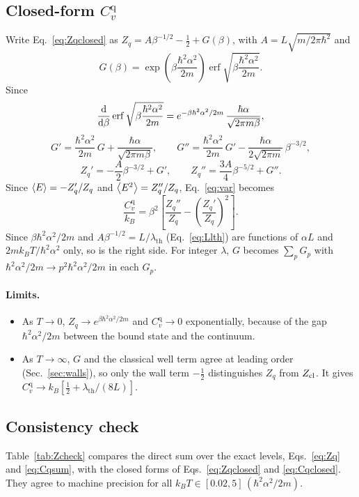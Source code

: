 \documentclass[11pt]{article}
\numberwithin{equation}{section}
\providecommand{\erf}{\operatorname{erf}}
\newcommand{\lth}{\lambda_{\mathrm{th}}}
\newcommand{\Cq}{C_v^{\mathrm{q}}}
\newcommand{\kB}{k_{B}}
\begin{document}
\subsection{Closed-form \texorpdfstring{$\Cq$}{Cq}}
Write Eq.~\eqref{eq:Zqclosed} as $Z_q=A\beta^{-1/2}-\tfrac12+G(\beta)$, with $A=L\sqrt{m/2\pi\hbar^2}$ and
\[
G(\beta)=\exp\!\left(\beta\frac{\hbar^2\alpha^2}{2m}\right)\erf\sqrt{\beta\frac{\hbar^2\alpha^2}{2m}} .
\]
Since
\[
\dv{\beta}\erf\sqrt{\beta\frac{\hbar^2\alpha^2}{2m}}=e^{-\beta\hbar^2\alpha^2/2m}\,\frac{\hbar\alpha}{\sqrt{2\pi m\beta}},
\]
\begin{equation}
G'=\frac{\hbar^2\alpha^2}{2m}\,G+\frac{\hbar\alpha}{\sqrt{2\pi m\beta}},\qquad
G''=\frac{\hbar^2\alpha^2}{2m}\,G'-\frac{\hbar\alpha}{2\sqrt{2\pi m}}\,\beta^{-3/2},
\end{equation}
\begin{equation}
Z_q'=-\frac A2\beta^{-3/2}+G',\qquad Z_q''=\frac{3A}{4}\beta^{-5/2}+G''.
\end{equation}
Since $\expval{E}=-Z_q'/Z_q$ and $\expval{E^2}=Z_q''/Z_q$, Eq.~\eqref{eq:var} becomes
\begin{equation}
\boxed{\;\frac{\Cq}{\kB}=\beta^2\left[\frac{Z_q''}{Z_q}-\left(\frac{Z_q'}{Z_q}\right)^2\right].\;}
\label{eq:Cqclosed}
\end{equation}
Since $\beta\hbar^2\alpha^2/2m$ and $A\beta^{-1/2}=L/\lth$ (Eq.~\eqref{eq:Llth}) are functions of $\alpha L$ and $2m\kB T/\hbar^2\alpha^2$ only, so is the right side. For integer $\lambda$, $G$ becomes $\sum_pG_p$ with $\hbar^2\alpha^2/2m\to p^2\hbar^2\alpha^2/2m$ in each $G_p$.

\paragraph{Limits.}
\begin{itemize}[itemsep=2pt]
\item As $T\to0$, $Z_q\to e^{\beta\hbar^2\alpha^2/2m}$ and $\Cq\to0$ exponentially, because of the gap $\hbar^2\alpha^2/2m$ between the bound state and the continuum.
\item As $T\to\infty$, $G$ and the classical well term agree at leading order (Sec.~\ref{sec:walls}), so only the wall term $-\tfrac12$ distinguishes $Z_q$ from $Z_{\rm cl}$. It gives $\Cq\to\kB[\tfrac12+\lth/(8L)]$.
\end{itemize}

\subsection{Consistency check}
Table~\ref{tab:Zcheck} compares the direct sum over the exact levels, Eqs.~\eqref{eq:Zq} and \eqref{eq:Cqsum}, with the closed forms of Eqs.~\eqref{eq:Zqclosed} and \eqref{eq:Cqclosed}. They agree to machine precision for all $\kB T\in[0.02,5]\,(\hbar^2\alpha^2/2m)$.
\end{document}
